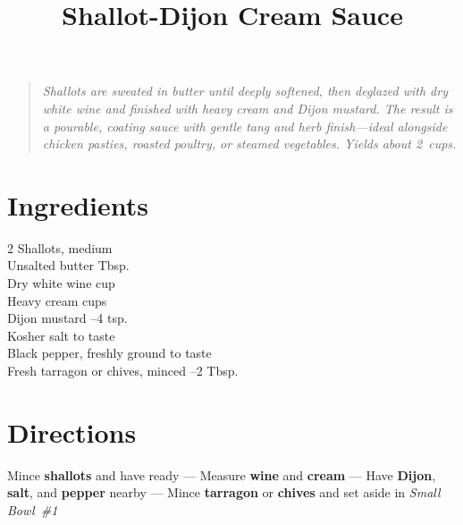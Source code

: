 \documentclass[11pt,letterpaper]{article}
\title{Shallot-Dijon Cream Sauce}
\author{}
\date{}
\begin{document}
\maketitle
\thispagestyle{empty}

\begin{quote}
\textit{Shallots are sweated in butter until deeply softened, then deglazed with dry white wine and finished with heavy cream and Dijon mustard. The result is a pourable, coating sauce with gentle tang and herb finish---ideal alongside chicken pasties, roasted poultry, or steamed vegetables. Yields about 2~cups.}
\end{quote}

\section*{Ingredients}

\setlength{\columnsep}{20pt}
\begin{multicols}{2}
\noindent
    Shallots, medium  \\
    Unsalted butter  Tbsp. \\
    Dry white wine \dotfill {} cup \\
    Heavy cream  cups \\
    \columnbreak
    Dijon mustard --4 tsp. \\
    Kosher salt \dotfill to taste \\
    Black pepper, freshly ground \dotfill to taste \\
    Fresh tarragon or chives, minced --2 Tbsp.
\end{multicols}

\section*{Directions}

\noindent
Mince \textbf{shallots} and have ready --- Measure \textbf{wine} and \textbf{cream} --- Have \textbf{Dijon}, \textbf{salt}, and \textbf{pepper} nearby --- Mince \textbf{tarragon} or \textbf{chives} and set aside in \textit{Small Bowl~\#1}
\end{document}
